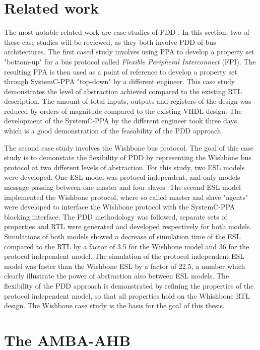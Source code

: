 \section{Related work}
\label{sec:related}
The most notable related work are case studies of PDD \cite{pddref}. In this section, two of these case studies will be reviewed, as they both involve PDD of bus architectures.
The first cased study involves using PPA to develop a property set "bottom-up" for a bus protocol called \textit{Flexible Peripheral Interconnect} (FPI). The resulting PPA is then used as a point of reference to develop a property set through SystemC-PPA "top-down" by a different engineer. This case study demonstrates the level of abstraction achieved compared to the existing RTL description. The amount of total inputs, outputs and registers of the design was reduced by orders of magnitude compared to the existing VHDL design. The development of the SystemC-PPA by the different engineer took three days, which is a good demonstration of the feasability of the PDD approach. \par
The second case study involves the Wishbone bus protocol. The goal of this case study is to demonstate the flexibility of PDD by representing the Wishbone bus protocol at two different levels of abstraction. For this study, two ESL models were developed. One ESL model was protocol independent, and only models message passing between one master and four slaves. The second ESL model implemented the Wishbone protocol, where so called master and slave "agents" were developed to interface the Wishbone protocol with the SystemC-PPA blocking interface. The PDD methodology was followed, separate sets of properties and RTL were generated and developed respectively for both models. Simulations of both models showed a decrease of simulation time of the ESL compared to the RTL by a factor of 3.5 for the Wishbone model and 36 for the protocol independent model. The simulation of the protocol independent ESL model was faster than the Wishbone ESL by a factor of 22.5, a number which clearly illustrate the power of abstraction also between ESL models. The flexibility of the PDD approach is demonstrated by refining the properties of the protocol independent model, so that all properties hold on the Whishbone RTL design. The Wishbone case study is the basis for the goal of this thesis. 


\section{The AMBA-AHB}
\label{sec:ahb}

